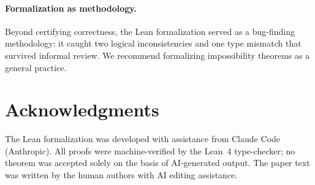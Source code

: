 \documentclass{jmlr}
\begin{document}
\paragraph{Formalization as methodology.}
Beyond certifying correctness, the Lean formalization served as a bug-finding methodology: it caught two logical inconsistencies and one type mismatch that survived informal review. We recommend formalizing impossibility theorems as a general practice.

\section*{Acknowledgments}
The Lean formalization was developed with assistance from Claude Code (Anthropic). All proofs were machine-verified by the Lean~4 type-checker; no theorem was accepted solely on the basis of AI-generated output. The paper text was written by the human authors with AI editing assistance.


\end{document}
